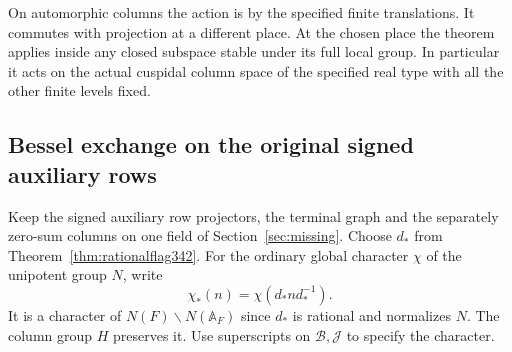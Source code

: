 \documentclass[a4paper,11pt]{article}
\theoremstyle{definition}
\theoremstyle{remark}
\numberwithin{equation}{section}
\begin{document}
On automorphic columns the action is by the specified finite
translations. It commutes with projection at a different place.
At the chosen place the theorem applies inside any closed subspace
stable under its full local group. In particular it acts on the
actual cuspidal column space of the specified real type with all
the other finite levels fixed.


\subsection{Bessel exchange on the original signed auxiliary rows}\label{sec:rationalperiod342}
Keep the signed auxiliary row projectors, the terminal graph and the
separately zero-sum columns on one field of Section~\ref{sec:missing}.
Choose $d_*$ from Theorem~\ref{thm:rationalflag342}. For the ordinary
global character $\chi$ of the unipotent group $N$, write
\[
                     \chi_*(n)=\chi(d_* n d_*^{-1}).
\]
It is a character of $N(F)\backslash N(\mathbb A_F)$ since $d_*$
is rational and normalizes $N$. The column group $H$ preserves it.
Use superscripts on $\mathcal B,\mathcal J$ to specify the character.
\end{document}
